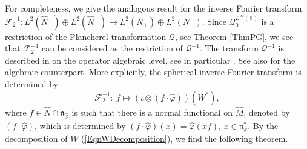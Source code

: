 \documentclass[pdftex]{sigma}
\numberwithin{equation}{section}
\theoremstyle{definition}
\begin{document}
For completeness, we give the analogous result for the inverse Fourier transform $\mathcal{F}_2^{-1}:   L^2(\hat{N}_+) \oplus L^2(\hat{N}_-)\rightarrow L^2(N_+) \oplus L^2(N_-)$. Since $\mathcal{Q}_0^{L^\infty(\mathbb{T})}$ is a restriction of the Plancherel transformation $\mathcal{Q}$, see Theorem \ref{ThmPG}, we see that  $\mathcal{F}_2^{-1}$ can be considered as the restriction of $\mathcal{Q}^{-1}$.
The transform  $\mathcal{Q}^{-1}$ is described in \cite{Cas}  on the operator algebraic level, see in particular \cite[Example~3.13]{Cas}. See also \cite{DaeFou} for the algebraic counterpart. More explicitly, the spherical inverse Fourier transform is determined by
\[
\mathcal{F}_2^{-1}: \ f \mapsto (\iota \otimes (f \cdot \hat{\varphi}))(W^\ast),
\]
where $f \in \hat{N} \cap \mathfrak{n}_{\hat{\varphi}}$ is such that there is a normal functional on $\hat{M}$, denoted by $(f \cdot \hat{\varphi})$, which is determined by $(f \cdot \hat{\varphi})(x) = \hat{\varphi}(x f)$, $x \in \mathfrak{n}_{\hat{\varphi}}^\ast$. By the decomposition of $W$ (\ref{EqnWDecomposition}), we f\/ind the following theorem.
\end{document}
